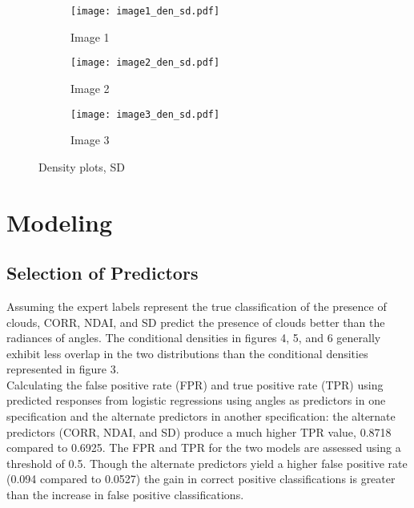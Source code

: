 \documentclass[11pt]{article}
\begin{document}
\begin{figure}[!h]
\begin{subfigure}{.33\linewidth}
  \centering
  \texttt{[image: image1\_den\_sd.pdf]}
  \caption{Image 1}
  \label{fig:sfig1}
\end{subfigure}%
\begin{subfigure}{.33\linewidth}
  \centering
  \texttt{[image: image2\_den\_sd.pdf]}
  \caption{Image 2}
  \label{fig:sfig2}
\end{subfigure}%
\begin{subfigure}{.33\linewidth}
  \centering
  \texttt{[image: image3\_den\_sd.pdf]}
  \caption{Image 3}
  \label{fig:sfig2}
\end{subfigure}
\caption{Density plots, SD}
\label{fig:fig}
\end{figure}

\section{Modeling}
\subsection{Selection of Predictors}
Assuming the expert labels represent the true classification of the presence of clouds, CORR, NDAI, and SD predict the presence of clouds better than the radiances of angles.  The conditional densities in figures 4, 5, and 6 generally exhibit less overlap in the two distributions than the conditional densities represented in figure 3.  \\
\indent Calculating the false positive rate (FPR) and true positive rate (TPR) using predicted responses from logistic regressions using angles as predictors in one specification and the alternate predictors in another specification: the alternate predictors (CORR, NDAI, and SD) produce a much higher TPR value, 0.8718 compared to 0.6925.  The FPR and TPR for the two models are assessed using a threshold of 0.5. Though the alternate predictors yield a higher false positive rate (0.094 compared to 0.0527) the gain in correct positive classifications is greater than the increase in false positive classifications. 
\end{document}
